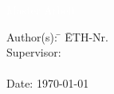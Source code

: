 %
%
%
%


\begin{titlepage}


{
\vspace{5mm}
{\Huge\textcolor{white}{Master Arbeit}}\\[2mm]
{\Huge\textcolor{white}{\textbf{\mytitle}}}

{\color{white} 
\begin{tabbing}
Author(s): \hspace{20mm} \= \myauthor \hspace{20mm} \= ETH-Nr. \myethnr \\[3mm]
Supervisor: \> \myprofessor\\[1mm]
\> \mysupervisor\\[3mm]
Date: \> \today
\end{tabbing}
}
}
\vspace{7mm}
\begin{figure}[h!]
  \centering
  
\end{figure}




\end{titlepage}


%

